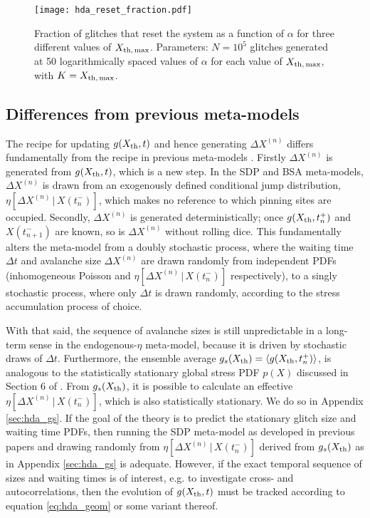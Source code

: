 \begin{figure}
\centering
\texttt{[image: hda\_reset\_fraction.pdf]}
\caption{Fraction of glitches that reset the system as a function of $\alpha$ for three different values of $X_{\rm th,\,max}$. Parameters: $N=10^5$ glitches generated at 50 logarithmically spaced values of $\alpha$ for each value of $X_{\rm th,\,max}$, with $K=X_{\rm th,\,max}$. \label{fig:hda_reset}}
\end{figure}

\subsection{Differences from previous meta-models}
The recipe for updating $g(X_{\rm th},t)$ and hence generating $\Delta X^{(n)}$ differs fundamentally from the recipe in previous meta-models \citep{Fulgenzi2017, Carlin2019quasi, Carlin2020bsa}. Firstly $\Delta X^{(n)}$ is generated from $g(X_{\rm th},t)$, which is a new step. In the SDP and BSA meta-models, $\Delta X^{(n)}$ is drawn from an exogenously defined conditional jump distribution, $\eta[\Delta X^{(n)}\,|\,X(t_{n}^-)]$, which makes no reference to which pinning sites are occupied. Secondly, $\Delta X^{(n)}$ is generated deterministically; once $g(X_{\rm th},t_{n}^+)$ and $X(t_{n+1}^-)$ are known, so is $\Delta X^{(n)}$ without rolling dice. This fundamentally alters the meta-model from a doubly stochastic process, where the waiting time $\Delta t$ and avalanche size $\Delta X^{(n)}$ are drawn randomly from independent PDFs (inhomogeneous Poisson and $\eta[\Delta X^{(n)}\,|\,X(t_{n}^-)]$ respectively), to a singly stochastic process, where only $\Delta t$ is drawn randomly, according to the stress accumulation process of choice. 

With that said, the sequence of avalanche sizes is still unpredictable in a long-term sense in the endogenous-$\eta$ meta-model, because it is driven by stochastic draws of $\Delta t$. Furthermore, the ensemble average $g_s(X_{\rm th}) = \langle g(X_{\rm th}, t_n^+)\rangle$, is analogous to the statistically stationary global stress PDF $p(X)$ discussed in Section 6 of \citet{Fulgenzi2017}. From $g_s(X_{\rm th})$, it is possible to calculate an effective $\eta[\Delta X^{(n)}\,|\,X(t_{n}^-)]$, which is also statistically stationary. We do so in Appendix \ref{sec:hda_gs}. If the goal of the theory is to predict the stationary glitch size and waiting time PDFs, then running the SDP meta-model as developed in previous papers and drawing randomly from $\eta[\Delta X^{(n)}\,|\,X(t_{n}^-)]$ derived from $g_s(X_{\rm th})$ as in Appendix \ref{sec:hda_gs} is adequate. However, if the exact temporal sequence of sizes and waiting times is of interest, e.g. to investigate cross- and autocorrelations, then the evolution of $g(X_{\rm th}, t)$ must be tracked according to equation \eqref{eq:hda_geom} or some variant thereof.


